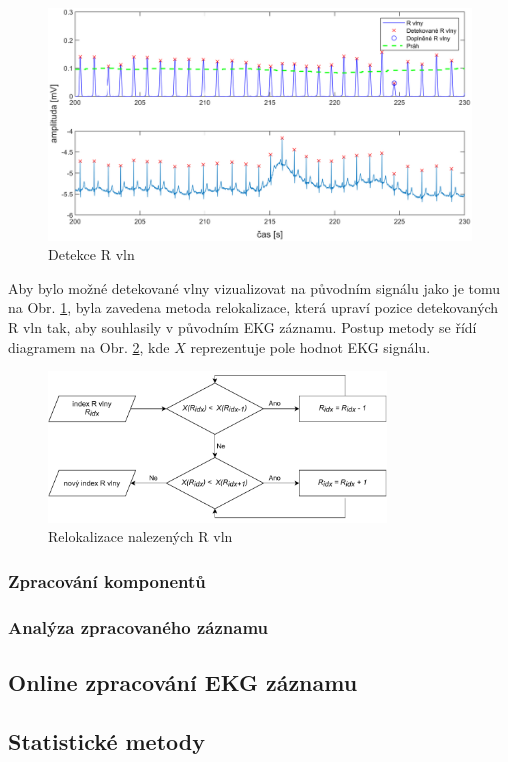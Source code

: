 \begin{figure}[h]
    \begin{center}
        \includegraphics[width=1\textwidth]{../assets/figures/detection}
        \caption{Detekce R vln}
        \label{fig:detection}
    \end{center}
\end{figure}

Aby bylo možné detekované vlny vizualizovat na původním signálu jako je tomu na
Obr. \ref{fig:detection}, byla zavedena metoda relokalizace, která upraví pozice
detekovaných R vln tak, aby souhlasily v původním EKG záznamu. Postup metody se
řídí diagramem na Obr. \ref{fig:fixpeaks}, kde $X$ reprezentuje pole hodnot EKG
signálu.

\begin{figure}[h]
    \begin{center}
        \includegraphics[width=0.8\textwidth]{../assets/figures/fixpeaks}
        \caption{Relokalizace nalezených R vln}
        \label{fig:fixpeaks}
    \end{center}
\end{figure}

\subsubsection{Zpracování komponentů}
\label{section:components_processing}


\subsubsection{Analýza zpracovaného záznamu}
\label{section:analyze}

\subsection{Online zpracování EKG záznamu}
\label{section:online_processing}

\subsection{Statistické metody}
\label{section:statistical_methods}